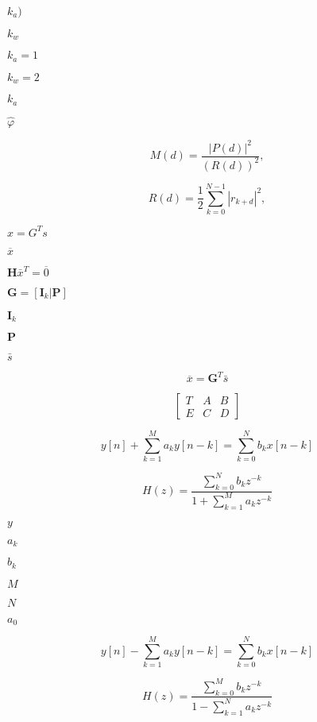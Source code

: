 \documentclass{article}
\begin{document}
$k_a)$
\pagebreak

$k_w$
\pagebreak

$k_a=1$
\pagebreak

$k_w=2$
\pagebreak

$k_a$
\pagebreak

$\hat{\varphi}$
\pagebreak

\[ M(d) = \frac{|P(d)|^2}{(R(d))^2}, \]
\pagebreak

\[ R(d) = \frac{1}{2} \sum_{k=0}^{N-1} |r_{k+d}|^2, \]
\pagebreak

$ x=G^T s $
\pagebreak

$\overline{x}$
\pagebreak

$\mathbf{H}\bar{x}^{T}=\overline{0}$
\pagebreak

$\mathbf{G}=\left[\mathbf{I}_{k}|\mathbf{P}\right]$
\pagebreak

$\mathbf{I}_{k}$
\pagebreak

$\mathbf{P}$
\pagebreak

$\bar{s}$
\pagebreak

\[\overline{x}=\mathbf{G}^{T}\bar{s}\]
\pagebreak

\[\left[\begin{array}{ccc} T & A & B\\ E & C & D \end{array}\right]\]
\pagebreak

\[ y[n] + \sum_{k=1}^{M} a_k y[n-k] = \sum_{k=0}^{N} b_k x[n-k] \]
\pagebreak

\[ H(z) = \frac{\sum_{k=0}^{N} b_k z^{-k}}{1 + \sum_{k=1}^{M} a_k z^{-k}} \]
\pagebreak

$y$
\pagebreak

$a_k$
\pagebreak

$b_k$
\pagebreak

$M$
\pagebreak

$N$
\pagebreak

$a_0$
\pagebreak

\[ y[n] - \sum_{k=1}^{M} a_k y[n-k] = \sum_{k=0}^{N} b_k x[n-k] \]
\pagebreak

\[ H(z) = \frac{\sum_{k=0}^{M} b_k z^{-k}}{1 - \sum_{k=1}^{N} a_k z^{-k}} \]
\pagebreak
\end{document}
